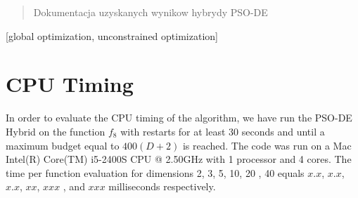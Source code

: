 \documentclass{sig-alternate}
\newcommand{\change}[1]{{\color{red} #1}}
\begin{document}

\maketitle
\begin{abstract}
Dokumentacja uzyskanych wynikow hybrydy PSO-DE
\end{abstract}

[global optimization,
unconstrained optimization]



%
%
%
\section{CPU Timing}
In order to evaluate the CPU timing of the algorithm, we have run the \change{PSO-DE Hybrid} on the function $f_{8}$ with restarts for at least 30 seconds and until a maximum budget equal to \change{$400 (D + 2)$} is reached. The code was run on a \change{Mac Intel(R) Core(TM) i5-2400S CPU @ 2.50GHz} with \change{1} processor and \change{4} cores. The time per function evaluation for dimensions 2, 3, 5, 10, 20\change{, 40} equals \change{$x.x$}, \change{$x.x$}, \change{$x.x$}, \change{$xx$}, \change{$xxx$}\change{, and $xxx$} milliseconds respectively. 
\end{document}
